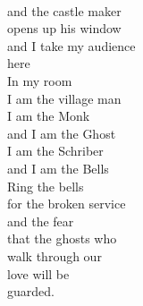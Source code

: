 \documentclass[smalldemyvopaper,11pt,twoside,onecolumn,openright,extrafontsizes]{memoir}
\begin{document}
\\and the castle maker
\\opens up his window
\\and I take my audience
\\here
\\In my room
\\I am the village man
\\I am the Monk
\\and I am the Ghost
\\I am the Schriber
\\and I am the Bells
\\Ring the bells
\\for the broken service
\\and the fear
\\that the ghosts who
\\walk through our
\\love will be
\\guarded.
\end{document}
